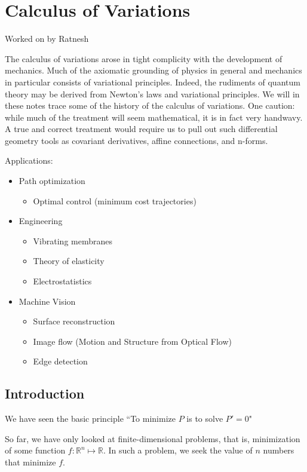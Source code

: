 \chapter{Calculus of Variations}
Worked on by Ratnesh

The calculus of variations arose in tight complicity with the development of mechanics. 
Much of the axiomatic grounding of physics in general and mechanics in particular consists of variational principles. 
Indeed, the rudiments of quantum theory may be derived from Newton's laws and variational principles. 
We will in these notes trace some of the history of the calculus of variations. 
One caution: while much of the treatment will seem mathematical, it is in fact very handwavy. 
A true and correct treatment would require us to pull out such differential geometry tools as covariant derivatives, affine connections, and n-forms. 

Applications:
\begin{itemize}
    \item Path optimization
       \begin{itemize}
            \item Optimal control (minimum cost trajectories)
        \end{itemize}
    \item Engineering
        \begin{itemize}
            \item Vibrating membranes
            \item Theory of elasticity
            \item Electrostatistics
        \end{itemize}
    \item Machine Vision
        \begin{itemize}
            \item Surface reconstruction
            \item Image flow (Motion and Structure from Optical Flow)
            \item Edge detection
        \end{itemize}    
\end{itemize}

\section{Introduction}
We have seen the basic principle ``To minimize $P$ is to solve $P' = 0$"

So far, we have only looked at finite-dimensional problems, that is, minimization of some function $f: \mathbb{R}^n \mapsto \mathbb{R}$. 
In such a problem, we seek the value of $n$ numbers that minimize $f$. 

